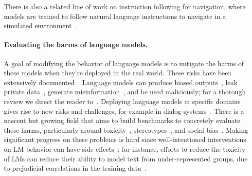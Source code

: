\documentclass{article}
\begin{document}
There is also a related line of work on instruction following for navigation, where models are trained to follow natural language instructions to navigate in a simulated environment~\citep{bahdanau2018learning,abramson2020imitating,zhao2021evaluation}.

\paragraph{Evaluating the harms of language models.} A goal of modifying the behavior of language models is to mitigate the harms of these models when they're deployed in the real world. These risks have been extensively documented~\citep{bender2021dangers,bommasani2021opportunities,kenton2021alignment,weidinger2021ethical,tamkin2021understanding}. Language models can produce biased outputs~\citep{dhamala2021bold,liang2021towards,manela2021stereotype,caliskan2017semantics,kirk2021true}, leak private data~\citep{carlini2021extracting}, generate misinformation~\citep{solaiman2019release,buchanan2021truth}, and be used maliciously; for a thorough review we direct the reader to~\citet{weidinger2021ethical}. Deploying language models in specific domains gives rise to new risks and challenges, for example in dialog systems~\citep{henderson2018ethical,xu2020recipes,dinan2019build}. There is a nascent but growing field that aims to build benchmarks to concretely evaluate these harms, particularly around toxicity~\citep{gehman2020realtoxicityprompts}, stereotypes~\citep{nadeem2020stereoset}, and social bias~\citep{dhamala2021bold,nangia2020crows,rudinger2018gender}. Making significant progress on these problems is hard since well-intentioned interventions on LM behavior can have side-effects~\citep{welbl2021challenges,blodgett2020language}; for instance, efforts to reduce the toxicity of LMs can reduce their ability to model text from under-represented groups, due to prejudicial correlations in the training data~\citep{xu2021detoxifying}.
\end{document}
